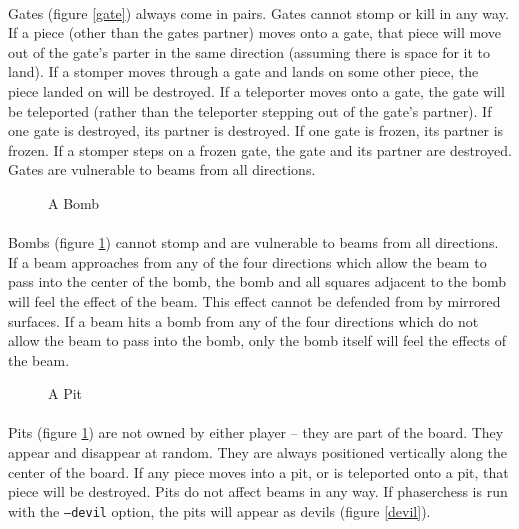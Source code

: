 \paragraph[]{}
Gates (figure \ref{gate}) always come in pairs.  Gates cannot stomp or
kill in any way.  If a piece (other than the gates partner) moves onto
a gate, that piece will move out of the gate's parter in the same
direction (assuming there is space for it to land).  If a stomper
moves through a gate and lands on some other piece, the piece landed
on will be destroyed.  If a teleporter moves onto a gate, the gate
will be teleported (rather than the teleporter stepping out of the
gate's partner).  If one gate is destroyed, its partner is destroyed.
If one gate is frozen, its partner is frozen.  If a stomper steps on a
frozen gate, the gate and its partner are destroyed.  Gates are
vulnerable to beams from all directions.

\begin{figure}[htb]
	\caption{A Bomb}
	\label{bomb}
\end{figure}

\paragraph[]{}
Bombs (figure \ref{bomb}) cannot stomp and are vulnerable to beams
from all directions.  If a beam approaches from any of the four
directions which allow the beam to pass into the center of the bomb,
the bomb and all squares adjacent to the bomb will feel the effect of
the beam.  This effect cannot be defended from by mirrored surfaces.
If a beam hits a bomb from any of the four directions which do not
allow the beam to pass into the bomb, only the bomb itself will feel
the effects of the beam.

\begin{figure}[htb]
	\caption{A Pit}
	\label{pit}
\end{figure}

\paragraph[]{}
Pits (figure \ref{bomb}) are not owned by either player -- they are
part of the board.  They appear and disappear at random.  They are
always positioned vertically along the center of the board.  If any
piece moves into a pit, or is teleported onto a pit, that piece will
be destroyed.  Pits do not affect beams in any way.  If phaserchess is
run with the {\tt --devil} option, the pits will appear as devils (figure
\ref{devil}).


